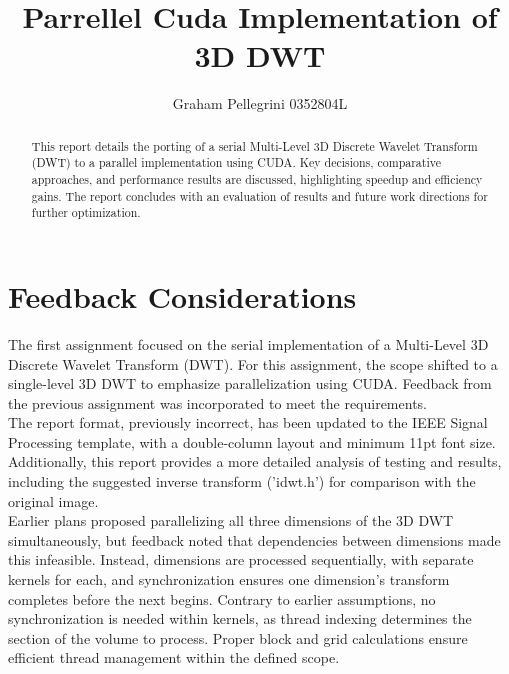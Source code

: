 \documentclass[journal,11pt]{IEEEtran}
\begin{document}
\title{Parrellel Cuda Implementation of 3D DWT}
\author{Graham Pellegrini 0352804L}


\maketitle

\begin{abstract}
    This report details the porting of a serial Multi-Level 3D Discrete Wavelet Transform (DWT) to a parallel implementation using CUDA. Key decisions, comparative approaches, and performance results are discussed, highlighting speedup and efficiency gains. The report concludes with an evaluation of results and future work directions for further optimization.
\end{abstract}
    

\section{Feedback Considerations}

The first assignment focused on the serial implementation of a Multi-Level 3D Discrete Wavelet Transform (DWT). For this assignment, the scope shifted to a single-level 3D DWT to emphasize parallelization using CUDA. Feedback from the previous assignment was incorporated to meet the requirements.\\

The report format, previously incorrect, has been updated to the IEEE Signal Processing template, with a double-column layout and minimum 11pt font size. Additionally, this report provides a more detailed analysis of testing and results, including the suggested inverse transform ('idwt.h') for comparison with the original image.\\

Earlier plans proposed parallelizing all three dimensions of the 3D DWT simultaneously, but feedback noted that dependencies between dimensions made this infeasible. Instead, dimensions are processed sequentially, with separate kernels for each, and synchronization ensures one dimension's transform completes before the next begins. Contrary to earlier assumptions, no synchronization is needed within kernels, as thread indexing determines the section of the volume to process. Proper block and grid calculations ensure efficient thread management within the defined scope.\\
\end{document}
